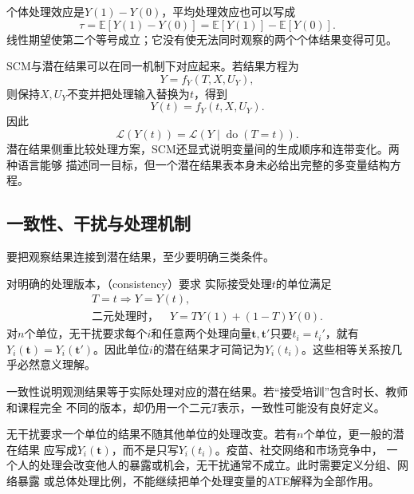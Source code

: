 个体处理效应是\(Y(1)-Y(0)\)，平均处理效应也可以写成
\begin{equation}
  \tau
  =
  \mathbb{E}[Y(1)-Y(0)]
  =
  \mathbb{E}[Y(1)]-\mathbb{E}[Y(0)].
  \label{eq:causal-ate-potential-outcomes}
\end{equation}
线性期望使第二个等号成立；它没有使无法同时观察的两个个体结果变得可见。

SCM与潜在结果可以在同一机制下对应起来。若结果方程为
\[
  Y=f_Y(T,X,U_Y),
\]
则保持\(X,U_Y\)不变并把处理输入替换为\(t\)，得到
\begin{equation}
  Y(t)=f_Y(t,X,U_Y).
  \label{eq:causal-scm-potential-outcome}
\end{equation}
因此
\[
  \mathcal{L}(Y(t))
  =
  \mathcal{L}(Y\mid\operatorname{do}(T=t)).
\]
潜在结果侧重比较处理方案，SCM还显式说明变量间的生成顺序和连带变化。两种语言能够
描述同一目标，但一个潜在结果表本身未必给出完整的多变量结构方程。

\subsection{一致性、干扰与处理机制}

要把观察结果连接到潜在结果，至少要明确三类条件。
\begin{definition}[处理一致性与无干扰]
  \label{def:causal-consistency-no-interference}
  对明确的处理版本，（consistency）要求
实际接受处理\(t\)的单位满足
\begin{equation}
  \begin{gathered}
    T=t\Longrightarrow Y=Y(t),\\
    \text{二元处理时，}\quad Y=TY(1)+(1-T)Y(0).
  \end{gathered}
  \label{eq:causal-consistency}
\end{equation}
对\(n\)个单位，无干扰要求每个\(i\)和任意两个处理向量\(\bm t,\bm t'\)只要\(t_i=t_i'\)，就有\(Y_i(\bm t)=Y_i(\bm t')\)。因此单位\(i\)的潜在结果才可简记为\(Y_i(t_i)\)。这些相等关系按几乎必然意义理解。
\end{definition}
一致性说明观测结果等于实际处理对应的潜在结果。若“接受培训”包含时长、教师和课程完全
不同的版本，却仍用一个二元\(T\)表示，一致性可能没有良好定义。

无干扰要求一个单位的结果不随其他单位的处理改变。若有\(n\)个单位，更一般的潜在结果
应写成\(Y_i(\bm{t})\)，而不是只写\(Y_i(t_i)\)。疫苗、社交网络和市场竞争中，
一个人的处理会改变他人的暴露或机会，无干扰通常不成立。此时需要定义分组、网络暴露
或总体处理比例，不能继续把单个处理变量的ATE解释为全部作用。

